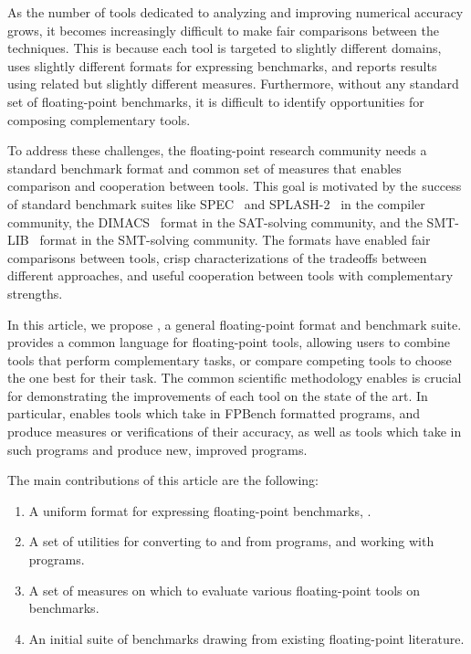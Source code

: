 \documentclass[main.tex]{subfiles}
\begin{document}
As the number of tools dedicated to analyzing and improving numerical
accuracy grows, it becomes increasingly difficult to make fair
comparisons between the techniques.  This is because each tool is targeted
to slightly different domains, uses slightly different formats for
expressing benchmarks, and reports results using related but slightly
different measures.  Furthermore, without any standard set of floating-point
benchmarks, it is difficult to identify opportunities for composing
complementary tools.

To address these challenges, the floating-point research community needs a
standard benchmark format and common set of measures that enables
comparison and cooperation between tools.  This goal is motivated by the
success of standard benchmark suites like SPEC~\cite{spec} and
SPLASH-2~\cite{splash} in
the compiler community, the DIMACS~\cite{dimacs} format in the SAT-solving
community, and the SMT-LIB~\cite{smtlib} format in the SMT-solving community.
The formats have enabled fair comparisons between tools, crisp
characterizations of the tradeoffs between different approaches, and useful
cooperation between tools with complementary strengths.

In this article, we propose \name, a general floating-point format and
benchmark suite. \name provides a common language for floating-point tools,
allowing users to combine tools that perform complementary tasks,
or compare competing tools to choose the one best for their task.
The common scientific methodology \name enables
is crucial for demonstrating the
improvements of each tool on the state of the art.
In particular, \name enables tools which take in
FPBench formatted programs,
and produce measures or verifications of their accuracy,
as well as tools which take in such programs
and produce new, improved programs.

The main contributions of this article are the following:
\begin{enumerate}[label=(\roman*)]
%
\item A uniform format for expressing floating-point benchmarks, \core.
%
\item A set of utilities for converting to and from \core programs, and
  working with \core programs.
%
\item A set of measures on which to evaluate various floating-point tools
  on \name benchmarks.
%
\item An initial suite of benchmarks drawing from existing floating-point
  literature.
%
\end{enumerate}
\end{document}
